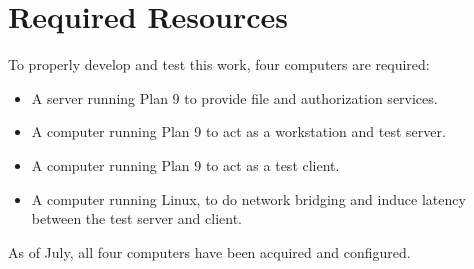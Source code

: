 \documentclass[12pt,american]{report}
\begin{document}

\chapter{Required Resources}
To properly develop and test this work, four computers are required:
\begin{itemize}
\item A server running Plan 9 to provide file and authorization services.
\item A computer running Plan 9 to act as a workstation and test server.
\item A computer running Plan 9 to act as a test client.
\item A computer running Linux, to do network bridging and induce latency between the test server and client.
\end{itemize}
As of July, all four computers have been acquired and configured.

\nocite{*}


\begin{singlespace}

\end{singlespace}
\end{document}
